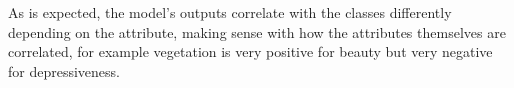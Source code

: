 As is expected, the model's outputs correlate with the classes differently depending on the attribute,
making sense with how the attributes themselves are correlated, for example vegetation is very positive
for beauty but very negative for depressiveness.

\begin{figure}[ht]
	\centering
	\hspace{0mm}
\end{figure}
